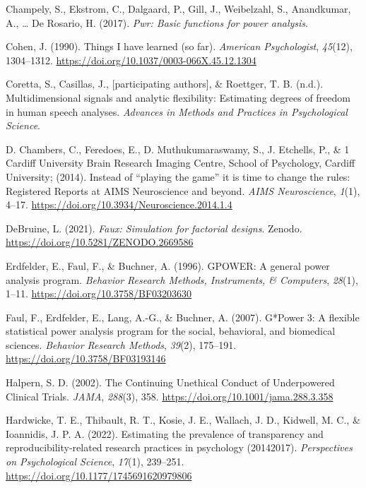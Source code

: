 \documentclass[
  man]{apa6}
\newlength{\cslhangindent}
\newlength{\cslentryspacingunit} %
\newenvironment{CSLReferences}[2] %
 {%
  \setlength{\parindent}{0pt}
  \ifodd #1
  \let\oldpar\par
  \def\par{\hangindent=\cslhangindent\oldpar}
  \fi
  \setlength{\parskip}{#2\cslentryspacingunit}
 }%
 {}
\begin{document}
\begin{CSLReferences}{1}{0}
\leavevmode{}%
Champely, S., Ekstrom, C., Dalgaard, P., Gill, J., Weibelzahl, S., Anandkumar, A., \ldots{} De Rosario, H. (2017). \emph{Pwr: Basic functions for power analysis}.

\leavevmode{}%
Cohen, J. (1990). Things I have learned (so far). \emph{American Psychologist}, \emph{45}(12), 1304--1312. \url{https://doi.org/10.1037/0003-066X.45.12.1304}

\leavevmode{}%
Coretta, S., Casillas, J., {[}participating authors{]}, \& Roettger, T. B. (n.d.). Multidimensional signals and analytic flexibility: Estimating degrees of freedom in human speech analyses. \emph{Advances in Methods and Practices in Psychological Science}.

\leavevmode{}%
D. Chambers, C., Feredoes, E., D. Muthukumaraswamy, S., J. Etchells, P., \& 1 Cardiff University Brain Research Imaging Centre, School of Psychology, Cardiff University; (2014). Instead of {``}playing the game{''} it is time to change the rules: Registered Reports at AIMS Neuroscience and beyond. \emph{AIMS Neuroscience}, \emph{1}(1), 4--17. \url{https://doi.org/10.3934/Neuroscience.2014.1.4}

\leavevmode{}%
DeBruine, L. (2021). \emph{Faux: Simulation for factorial designs}. Zenodo. \url{https://doi.org/10.5281/ZENODO.2669586}

\leavevmode{}%
Erdfelder, E., Faul, F., \& Buchner, A. (1996). GPOWER: A general power analysis program. \emph{Behavior Research Methods, Instruments, \& Computers}, \emph{28}(1), 1--11. \url{https://doi.org/10.3758/BF03203630}

\leavevmode{}%
Faul, F., Erdfelder, E., Lang, A.-G., \& Buchner, A. (2007). G*Power 3: A flexible statistical power analysis program for the social, behavioral, and biomedical sciences. \emph{Behavior Research Methods}, \emph{39}(2), 175--191. \url{https://doi.org/10.3758/BF03193146}

\leavevmode{}%
Halpern, S. D. (2002). The Continuing Unethical Conduct of Underpowered Clinical Trials. \emph{JAMA}, \emph{288}(3), 358. \url{https://doi.org/10.1001/jama.288.3.358}

\leavevmode{}%
Hardwicke, T. E., Thibault, R. T., Kosie, J. E., Wallach, J. D., Kidwell, M. C., \& Ioannidis, J. P. A. (2022). Estimating the prevalence of transparency and reproducibility-related research practices in psychology (2014{\textendash}2017). \emph{Perspectives on Psychological Science}, \emph{17}(1), 239--251. \url{https://doi.org/10.1177/1745691620979806}


\end{CSLReferences}
\end{document}
